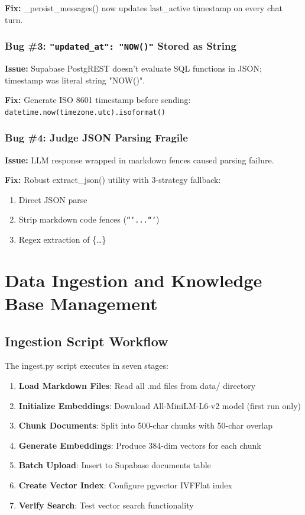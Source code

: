 \documentclass[10pt,twocolumn,a4paper]{article}
\begin{document}
\textbf{Fix:} \_persist\_messages() now updates last\_active timestamp on every chat turn.

\subsubsection{Bug \#3: \texttt{"updated\_at": "NOW()"} Stored as String}

\textbf{Issue:} Supabase PostgREST doesn't evaluate SQL functions in JSON; timestamp was literal string "NOW()".

\textbf{Fix:} Generate ISO 8601 timestamp before sending: \texttt{datetime.now(timezone.utc).isoformat()}

\subsubsection{Bug \#4: Judge JSON Parsing Fragile}

\textbf{Issue:} LLM response wrapped in markdown fences caused parsing failure.

\textbf{Fix:} Robust extract\_json() utility with 3-strategy fallback:
\begin{enumerate}
    \item Direct JSON parse
    \item Strip markdown code fences (\texttt{```...```})
    \item Regex extraction of \{\ldots\}
\end{enumerate}


\section{Data Ingestion and Knowledge Base Management}

\subsection{Ingestion Script Workflow}

The ingest.py script executes in seven stages:

\begin{enumerate}
    \item \textbf{Load Markdown Files}: Read all .md files from data/ directory
    \item \textbf{Initialize Embeddings}: Download All-MiniLM-L6-v2 model (first run only)
    \item \textbf{Chunk Documents}: Split into 500-char chunks with 50-char overlap
    \item \textbf{Generate Embeddings}: Produce 384-dim vectors for each chunk
    \item \textbf{Batch Upload}: Insert to Supabase documents table
    \item \textbf{Create Vector Index}: Configure pgvector IVFFlat index
    \item \textbf{Verify Search}: Test vector search functionality
\end{enumerate}
\end{document}
